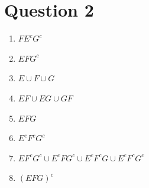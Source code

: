 \documentclass[12pt]{article}
\begin{document}
\section*{Question 2}
\begin{enumerate}[label=\alph*)]
    \item \(F E^{c} G^{c}  \) \vspace{-0.5\baselineskip}
    \item \(EFG^{c} \) \vspace{-0.5\baselineskip}
    \item \(E \cup F \cup G\)\vspace{-0.5\baselineskip}
    \item \(EF \cup EG \cup GF\)\vspace{-0.5\baselineskip}
    \item \(EFG\)\vspace{-0.5\baselineskip}
    \item \(E^{c} F^{c} G^{c} \) \vspace{-0.5\baselineskip}
    \item \(EF^{c} G^{c} \cup E^{c} FG^{c} \cup E^{c} F^{c} G \cup E^{c} F^{c} G^{c} \)\vspace{-0.5\baselineskip}
    \item \((EFG)^{c} \)  \vspace{-0.5\baselineskip}
\end{enumerate}
\end{document}
